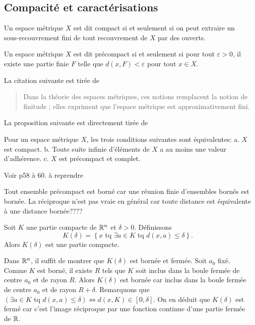 \subsection{Compacité et caractérisations}
\begin{defi}
 Un espace métrique $X$ est dit compact si et seulement si on peut extraire un sous-recouvrement fini de tout recouvrement de $X$ par des ouverts.
\end{defi}
\begin{defi}
 Un espace métrique $X$ est dit précompact si et seulement si pour tout $\varepsilon >0$, il existe une partie finie $F$ telle que $d(x,F) < \varepsilon$ pour tout $x \in X$.
\end{defi}
\noindent La citation suivante est tirée de \cite{dieudonne1969elements}
\begin{quotation}
 Dans la théorie des espaces métriques, ces notions remplacent la notion de \og finitude \fg; elles expriment que l'espace métrique est \og approximativement fini\fg.
\end{quotation}
La proposition suivante est directement tirée de \cite{dieudonne1969elements}
\begin{propn}\label{prop:CaracCompact}
 Pour un espace métrique $X$, les trois conditions suivantes sont équivalentes:\newline
 a. $X$ est compact.\newline
 b. Toute suite infinie d'éléments de $X$ a au moins une valeur d'adhérence.\newline
 c. $X$ est précompact et complet.
\end{propn}
\begin{demo}
 Voir \cite{dieudonne1969elements} p58 à 60. à reprendre
\end{demo}
\begin{rem}
 Tout ensemble précompact est borné car une réunion finie d'ensembles bornés est bornée. La réciproque n'est pas vraie en général car toute distance est équivalente à une distance bornée????
\end{rem}
\begin{propn} \label{compactEtendu}
Soit $K$ une partie compacte de $\mathbb{R}^n$ et $\delta >0$. Définissons
\begin{displaymath}
 K(\delta) = \left\lbrace x \text{ tq } \exists a \in K \text{ tq } d(x,a)\leq \delta  \right\rbrace.
\end{displaymath}
Alors $K(\delta)$ est une partie compacte.
\end{propn}
\begin{demo}
 Dans $\mathbb{R}^n$, il suffit de montrer que $K(\delta)$ est bornée et fermée.\newline
 Soit $a_0$ fixé. Comme $K$ est borné, il existe $R$ tels que $K$ soit inclus dans la boule fermée de centre $a_0$ et de rayon $R$. Alors $K(\delta)$ est bornée car inclus dans la boule fermée de centre $a_0$ et de rayon $R + \delta$.\newline
 Remarquons que $(\exists a \in K \text{ tq } d(x,a)\leq \delta) \Leftrightarrow d(x,K) \in [0,\delta]$. On en déduit que $K(\delta)$ est fermé car c'est l'image réciproque par une fonction continue d'une partie fermée de $\mathbb{R}$.
\end{demo}


